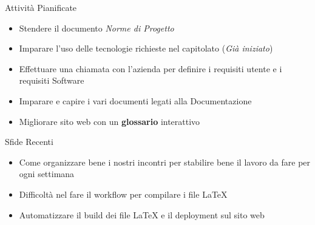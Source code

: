 \documentclass{beamer}
\begin{document}
\begin{frame}
    \begin{block}{Attività Pianificate}
        \begin{itemize}
            \item Stendere il documento \emph{Norme di Progetto} 
            \item Imparare l'uso delle tecnologie richieste nel capitolato (\textit{Già iniziato})
            \item Effettuare una chiamata con l'azienda per definire i requisiti utente e i requisiti Software
            \item Imparare e capire i vari documenti legati alla Documentazione
            \item Migliorare sito web con un \textbf{glossario} interattivo
        \end{itemize}
    \end{block}
\end{frame}

\begin{frame}
    \begin{alertblock}{Sfide Recenti}
        \begin{itemize}
            \item Come organizzare bene i nostri incontri per stabilire bene il lavoro da fare per ogni settimana
            \item Difficoltà nel fare il workflow per compilare i file LaTeX
            \item Automatizzare il build dei file LaTeX e il deployment sul sito web 
        \end{itemize}
    \end{alertblock}
\end{frame}
\end{document}
